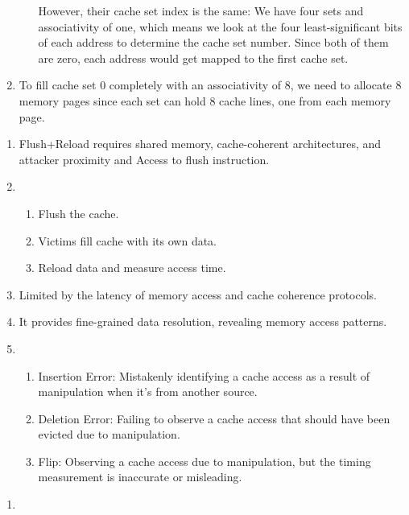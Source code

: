 \documentclass[sheet=2, english]{dexercise}
\begin{document}
\begin{enumerate}
\begin{enumerate}
        However, their cache set index is the same:
        We have four sets and associativity of one, which means we look at the
        four least-significant bits of each address to determine the cache set
        number.
        Since both of them are zero, each address would get mapped to the first
        cache set.
    \end{enumerate}
  \item
    To fill cache set 0 completely with an associativity of 8, we need to
    allocate 8 memory pages since each set can hold 8 cache lines, one from
    each memory page.
\end{enumerate}


\begin{enumerate}
  \item
  Flush+Reload requires shared memory, cache-coherent architectures, and
    attacker proximity and Access to flush instruction.
  \item
    \begin{enumerate}
      \item Flush the cache.
      \item Victims fill cache with its own data.
      \item Reload data and measure access time.
    \end{enumerate}
  \item Limited by the latency of memory access and cache coherence protocols.
  \item It provides fine-grained data resolution, revealing memory access patterns.
  \item
    \begin{enumerate}
      \item Insertion Error: Mistakenly identifying a cache access as a result
        of manipulation when it's from another source.
      \item Deletion Error: Failing to observe a cache access that should have
        been evicted due to manipulation.
      \item Flip: Observing a cache access due to manipulation, but the timing
        measurement is inaccurate or misleading.
    \end{enumerate}

\end{enumerate}


\begin{enumerate}
  \item
\end{enumerate}
\end{document}
